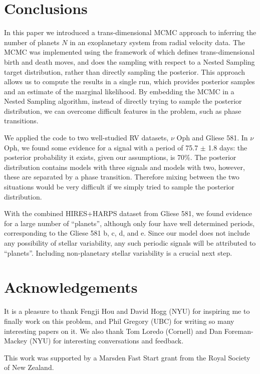 \documentclass[useAMS,usenatbib]{mn2e}
\begin{document}
\section{Conclusions}
In this paper we introduced a trans-dimensional MCMC approach to inferring
the number of planets $N$ in an exoplanetary system from radial velocity data.
The MCMC was implemented using the framework of \citet{rjobject} which
defines trans-dimensional birth and death moves, and does the sampling
with respect to a Nested Sampling target distribution, rather than directly
sampling the posterior. This approach allows us to compute the results in a
single run, which provides posterior samples and an estimate of the marginal
likelihood. By embedding the MCMC in a Nested Sampling algorithm, instead of
directly trying to sample the posterior distribution, we can overcome difficult
features in the problem, such as phase transitions.

We applied the code to two well-studied RV datasets, $\nu$ Oph and Gliese 581.
In $\nu$ Oph, we found some evidence for a signal with a period of
75.7 $\pm$ 1.8 days: the posterior probability it exists, given our assumptions,
is 70\%. The posterior distribution contains models with three signals and
models with two, however, these are separated by a phase transition. Therefore
mixing between the two situations would be very difficult if we simply tried
to sample the posterior distribution.

With the combined HIRES+HARPS dataset from Gliese 581, we found
evidence for a large number of ``planets'', although only four have well
determined periods, corresponding to the Gliese 581 b, c, d,
and e. Since our model does not include any possibility of stellar variability,
any such periodic signals will be attributed to ``planets''.
Including non-planetary stellar variability is a crucial next step.

\vspace{-0.5cm}
\section*{Acknowledgements}
It is a pleasure to thank Fengji Hou and David Hogg (NYU) for inspiring me to
finally work on this problem, and Phil Gregory (UBC) for writing so many
interesting papers on it. We also thank Tom Loredo (Cornell) and Dan
Foreman-Mackey (NYU) for interesting conversations and feedback.

This work was supported by a Marsden Fast Start
grant from the Royal Society of
New Zealand.
\end{document}
